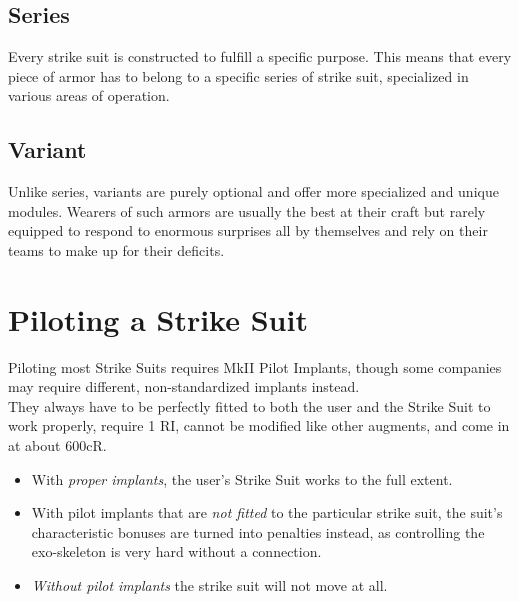 \documentclass[12pt,a4paper,openany]{book}
\begin{document}
	\section{Series}
	Every strike suit is constructed to fulfill a specific purpose. This means that every piece of armor has to belong to a specific series of strike suit, specialized in various areas of operation.
	
    \begin{multicols}{2}
    \end{multicols}
    
    \pagebreak
    \section{Variant}
    Unlike series, variants are purely optional and offer more specialized and unique modules. Wearers of such armors are usually the best at their craft but rarely equipped to respond to enormous surprises all by themselves and rely on their teams to make up for their deficits.
    
    \begin{multicols}{2}
    \end{multicols}
    
    \chapter{Piloting a Strike Suit}
    Piloting most Strike Suits requires MkII Pilot Implants, though some companies may require different, non-standardized implants instead.\\
    They always have to be perfectly fitted to both the user and the Strike Suit to work properly, require 1 RI, cannot be modified like other augments, and come in at about 600cR.\\
    \begin{itemize}
    	\item With \emph{proper implants}, the user's Strike Suit works to the full extent.
    	\item With pilot implants that are \emph{not fitted} to the particular strike suit, the suit's characteristic bonuses are turned into penalties instead, as controlling the exo-skeleton is very hard without a connection.
    	\item \emph{Without pilot implants} the strike suit will not move at all.
    \end{itemize}
    
\end{document}

